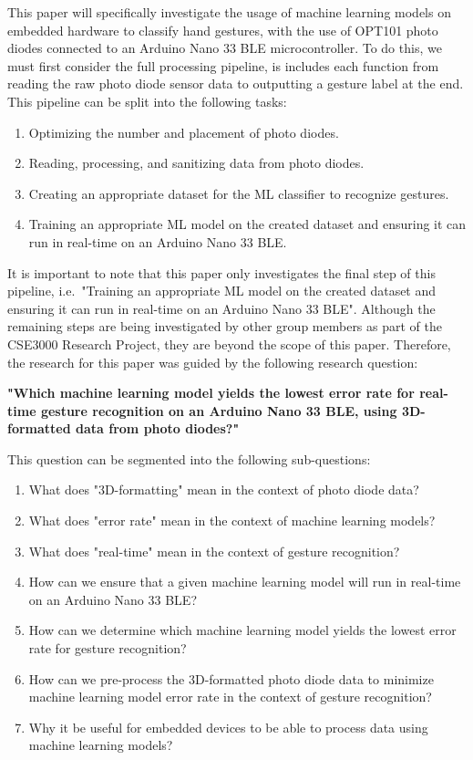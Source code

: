 This paper will specifically investigate the usage of machine learning models on embedded hardware to classify hand gestures, with the use of OPT101 photo diodes connected to an Arduino Nano 33 BLE microcontroller.
To do this, we must first consider the full processing pipeline, is includes each function from reading the raw photo diode sensor data to outputting a gesture label at the end.
This pipeline can be split into the following tasks:
\begin{enumerate}
    \item Optimizing the number and placement of photo diodes.
    \item Reading, processing, and sanitizing data from photo diodes.
    \item Creating an appropriate dataset for the ML classifier to recognize gestures.
    \item Training an appropriate ML model on the created dataset and ensuring it can run in real-time on an Arduino Nano 33 BLE\@.
\end{enumerate}
It is important to note that this paper only investigates the final step of this pipeline, i.e.\ "Training an appropriate ML model on the created dataset and ensuring it can run in real-time on an Arduino Nano 33 BLE\@".
Although the remaining steps are being investigated by other group members as part of the CSE3000 Research Project, they are beyond the scope of this paper.
Therefore, the research for this paper was guided by the following research question:

\textbf{"Which machine learning model yields the lowest error rate for real-time gesture recognition on an Arduino Nano 33 BLE, using 3D-formatted data from photo diodes?"}

This question can be segmented into the following sub-questions:
\begin{enumerate}
    \item What does "3D-formatting" mean in the context of photo diode data?
    \item What does "error rate" mean in the context of machine learning models?
    \item What does "real-time" mean in the context of gesture recognition?
    \item How can we ensure that a given machine learning model will run in real-time on an Arduino Nano 33 BLE?
    \item How can we determine which machine learning model yields the lowest error rate for gesture recognition?
    \item How can we pre-process the 3D-formatted photo diode data to minimize machine learning model error rate in the context of gesture recognition?
    \item Why it be useful for embedded devices to be able to process data using machine learning models?
\end{enumerate}

